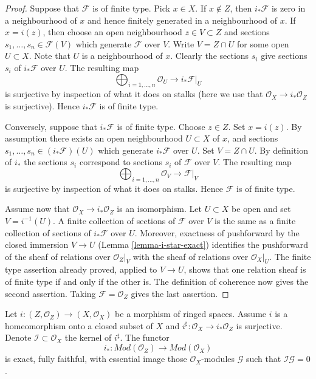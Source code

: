\begin{proof}
Suppose that $\mathcal{F}$ is of finite type.
Pick $x \in X$. If $x \not \in Z$, then $i_*\mathcal{F}$
is zero in a neighbourhood of $x$ and hence finitely generated in
a neighbourhood of $x$. If $x = i(z)$, then choose an open neighbourhood
$z \in V \subset Z$ and sections $s_1, \ldots, s_n \in \mathcal{F}(V)$
which generate $\mathcal{F}$ over $V$. Write $V = Z \cap U$ for some open
$U \subset X$. Note that $U$ is a neighbourhood of $x$. Clearly the
sections $s_i$ give sections $s_i$ of $i_*\mathcal{F}$ over $U$.
The resulting map
$$
\bigoplus\nolimits_{i = 1, \ldots, n} \mathcal{O}_U
\longrightarrow
i_*\mathcal{F}|_U
$$
is surjective by inspection of what it does on stalks
(here we use that $\mathcal{O}_X \to i_*\mathcal{O}_Z$
is surjective). Hence $i_*\mathcal{F}$
is of finite type.

\medskip\noindent
Conversely, suppose that $i_*\mathcal{F}$ is of finite type.
Choose $z \in Z$. Set $x = i(z)$. By assumption there exists
an open neighbourhood $U \subset X$ of $x$, and sections
$s_1, \ldots, s_n \in (i_*\mathcal{F})(U)$ which generate $i_*\mathcal{F}$
over $U$. Set $V = Z \cap U$. By definition of $i_*$ the sections
$s_i$ correspond to sections $s_i$ of $\mathcal{F}$ over $V$.
The resulting map
$$
\bigoplus\nolimits_{i = 1, \ldots, n} \mathcal{O}_V
\longrightarrow
\mathcal{F}|_V
$$
is surjective by inspection of what it does on stalks. Hence
$\mathcal{F}$ is of finite type.

\medskip\noindent
Assume now that $\mathcal{O}_X \to i_*\mathcal{O}_Z$ is an isomorphism.
Let $U \subset X$ be open and set $V = i^{-1}(U)$. A finite collection
of sections of $\mathcal{F}$ over $V$ is the same as a finite collection
of sections of $i_*\mathcal{F}$ over $U$. Moreover, exactness of
pushforward by the closed immersion $V \to U$
(Lemma \ref{lemma-i-star-exact}) identifies the pushforward
of the sheaf of relations over $\mathcal{O}_Z|_V$ with the sheaf of
relations over $\mathcal{O}_X|_U$. The finite type assertion already
proved, applied to $V \to U$, shows that one relation sheaf is of finite
type if and only if the other is. The definition of coherence now gives
the second assertion. Taking $\mathcal{F} = \mathcal{O}_Z$ gives the last
assertion.
\end{proof}

\begin{lemma}
\label{lemma-i-star-equivalence}
Let $i : (Z, \mathcal{O}_Z) \to (X, \mathcal{O}_X)$ be a morphism
of ringed spaces. Assume $i$ is a homeomorphism onto a closed subset of $X$
and $i^\sharp : \mathcal{O}_X \to i_*\mathcal{O}_Z$ is surjective.
Denote $\mathcal{I} \subset \mathcal{O}_X$ the kernel of $i^\sharp$.
The functor
$$
i_* :
\textit{Mod}(\mathcal{O}_Z)
\longrightarrow
\textit{Mod}(\mathcal{O}_X)
$$
is exact, fully faithful, with essential image those
$\mathcal{O}_X$-modules $\mathcal{G}$ such that $\mathcal{I}\mathcal{G} = 0$.
\end{lemma}


